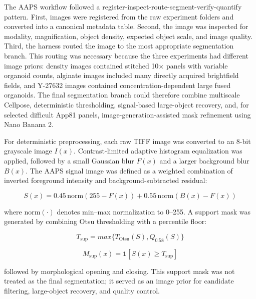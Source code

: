 \documentclass[
]{article}
\begin{document}
The AAPS workflow followed a register-inspect-route-segment-verify-quantify pattern. First, images were registered from the raw experiment folders and converted into a canonical metadata table. Second, the image was inspected for modality, magnification, object density, expected object scale, and image quality. Third, the harness routed the image to the most appropriate segmentation branch. This routing was necessary because the three experiments had different image priors: density images contained stitched 10× panels with variable organoid counts, alginate images included many directly acquired brightfield fields, and Y-27632 images contained concentration-dependent large fused organoids. The final segmentation branch could therefore combine multiscale Cellpose, deterministic thresholding, signal-based large-object recovery, and, for selected difficult App81 panels, image-generation-assisted mask refinement using Nano Banana 2.

For deterministic preprocessing, each raw TIFF image was converted to an 8-bit grayscale image \(I\left( x \right)\). Contrast-limited adaptive histogram equalization was applied, followed by a small Gaussian blur \(F\left( x \right)\) and a larger background blur \(B\left( x \right)\). The AAPS signal image was defined as a weighted combination of inverted foreground intensity and background-subtracted residual:

\[S\left( x \right) = 0.45\,\text{norm}\left( 255 - F\left( x \right) \right) + 0.55\,\text{norm}\left( B\left( x \right) - F\left( x \right) \right)\]

where \(\text{norm}\left( \cdot \right)\) denotes min--max normalization to 0--255. A support mask was generated by combining Otsu thresholding with a percentile floor:

\[T_{\sup} = max\{ T_{\text{Otsu}}\left( S \right),Q_{0.58}\left( S \right)\}\]

\[M_{\sup}\left( x \right) = \mathbf{1}\left\lbrack S\left( x \right) \geq T_{\sup} \right\rbrack\]

followed by morphological opening and closing. This support mask was not treated as the final segmentation; it served as an image prior for candidate filtering, large-object recovery, and quality control.
\end{document}
